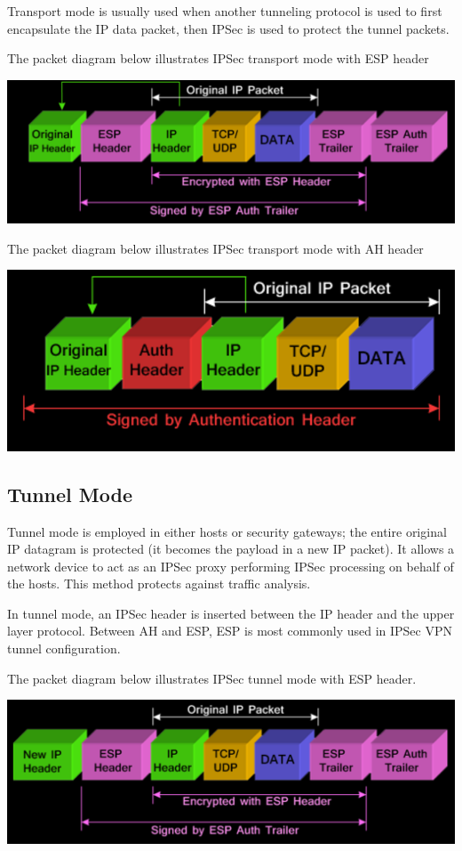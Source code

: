 \documentclass{article}
\begin{document}
Transport mode is usually used when another tunneling protocol is used to first encapsulate the IP data packet, then IPSec is used to protect the tunnel packets.

The packet diagram below illustrates IPSec transport mode with ESP header
\begin{center}
  \includegraphics[scale=0.6]{ipsec-transport.png}
\end{center}

The packet diagram below illustrates IPSec transport mode with AH header
\begin{center}
  \includegraphics[scale=0.6]{ipsec-transport-ah.png}
\end{center}

\subsection{Tunnel Mode}
Tunnel mode is employed in either hosts or security gateways; the entire original IP datagram is protected (it becomes the payload in a new IP packet). It allows a network device to act as an IPSec proxy performing IPSec processing on behalf of the hosts. This method protects against traffic analysis.

In tunnel mode, an IPSec header is inserted between the IP header and the upper layer protocol. Between AH and ESP, ESP is most commonly used in IPSec VPN tunnel configuration.

The packet diagram below illustrates IPSec tunnel mode with ESP header.
\begin{center}
  \includegraphics[scale=0.6]{ipsec-tunnel.png}
\end{center}
\end{document}
